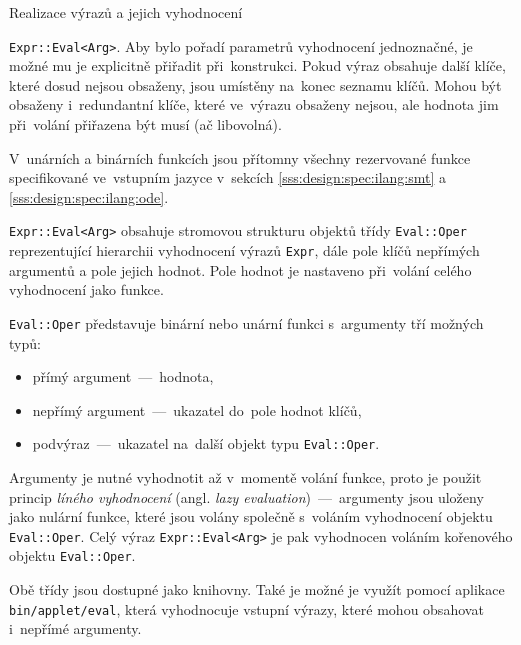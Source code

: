\documentclass[thesis=M,czech]{FITthesis}[2012/06/26]
\newcommand{\id}[1]{\texttt{#1}}
\newcommand{\hl}[1]{\textit{#1}}
\newcommand{\name}[1]{\hl{#1}}
\newcommand{\rf}[1]{\ref{#1}}
\newcommand{\binDir}{\id{bin}}
\newcommand{\appletDir}{\id{\binDir{}/\-applet}}
\newcommand{\appletFn}[1]{\id{\appletDir{}/\-#1}}
\begin{document}
\begin{section}{Realizace výrazů a jejich vyhodnocení}
\begin{paragraph}{\id{Expr::\-Eval<Arg>}.}
Aby bylo pořadí parametrů vyhodnocení jednoznačné,
je možné mu je explicitně přiřadit při~konstrukci.
Pokud výraz obsahuje další klíče,
které dosud nejsou obsaženy,
jsou umístěny na~konec seznamu klíčů.
Mohou být obsaženy i~redundantní klíče,
které ve~výrazu obsaženy nejsou,
ale hodnota jim při~volání přiřazena být musí (ač libovolná).

V~unárních a binárních funkcích jsou přítomny všechny
rezervované funkce specifikované ve~vstupním jazyce
v~sekcích \rf{sss:design:spec:ilang:smt} a \rf{sss:design:spec:ilang:ode}.

\id{Expr::\-Eval<Arg>} obsahuje stromovou strukturu
objektů třídy \id{Eval::\-Oper}
reprezentující hierarchii vyhodnocení výrazů \id{Expr},
dále pole klíčů nepřímých argumentů a pole jejich hodnot.
Pole hodnot je nastaveno při~volání celého vyhodnocení jako funkce.

\id{Eval::\-Oper} představuje binární nebo unární funkci
s~argumenty tří možných typů:
\begin{itemize}
\item přímý argument~---~hodnota,
\item nepřímý argument~---~ukazatel do~pole hodnot klíčů,
\item podvýraz~---~ukazatel na~další objekt typu \id{Eval::\-Oper}.
\end{itemize}
Argumenty je nutné vyhodnotit až v~momentě volání funkce,
proto je použit princip \name{líného vyhodnocení}
(angl. \name{lazy evaluation})~---~argumenty jsou uloženy
jako nulární funkce, které jsou volány společně
s~voláním vyhodnocení objektu \id{Eval::\-Oper}.
Celý výraz \id{Expr::\-Eval<Arg>} je pak vyhodnocen
voláním kořenového objektu \id{Eval::\-Oper}.
\end{paragraph} %


\bigskip

Obě třídy jsou dostupné jako knihovny.
Také je možné je využít pomocí aplikace \appletFn{eval},
která vyhodnocuje vstupní výrazy,
které mohou obsahovat i~nepřímé argumenty.
\end{section} %

\end{document}
